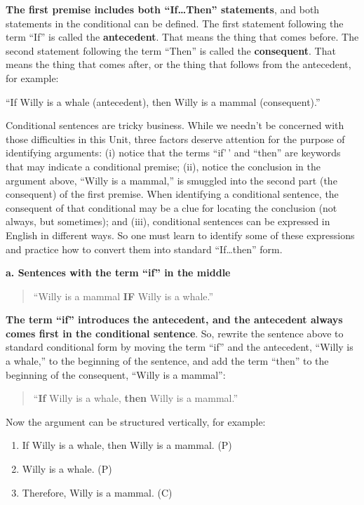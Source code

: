 \documentclass[
]{book}
\providecommand{\tightlist}{%
  \setlength{\itemsep}{0pt}\setlength{\parskip}{0pt}}
\begin{document}
\textbf{The first premise includes both ``If\ldots Then'' statements}, and both statements in the conditional can be defined. The first statement following the term ``If'' is called the \textbf{antecedent}. That means the thing that comes before. The second statement following the term ``Then'' is called the \textbf{consequent}. That means the thing that comes after, or the thing that follows from the antecedent, for example:

``If Willy is a whale (antecedent), then Willy is a mammal (consequent).''

Conditional sentences are tricky business. While we needn't be concerned with those difficulties in this Unit, three factors deserve attention for the purpose of identifying arguments: (i) notice that the terms ``if'\,' and ``then'' are keywords that may indicate a conditional premise; (ii), notice the conclusion in the argument above, ``Willy is a mammal,'' is smuggled into the second part (the consequent) of the first premise. When identifying a conditional sentence, the consequent of that conditional may be a clue for locating the conclusion (not always, but sometimes); and (iii), conditional sentences can be expressed in English in different ways. So one must learn to identify some of these expressions and practice how to convert them into standard ``If\ldots then'' form.

\textbf{a. Sentences with the term ``if'' in the middle}

\begin{quote}
``Willy is a mammal \textbf{IF} Willy is a whale.''
\end{quote}

\textbf{The term ``if'' introduces the antecedent, and the antecedent always comes first in the conditional sentence}. So, rewrite the sentence above to standard conditional form by moving the term ``if'' and the antecedent, ``Willy is a whale,'' to the beginning of the sentence, and add the term ``then'' to the beginning of the consequent, ``Willy is a mammal'':

\begin{quote}
``\textbf{If} Willy is a whale, \textbf{then} Willy is a mammal.''
\end{quote}

Now the argument can be structured vertically, for example:

\begin{enumerate}
\def\labelenumi{\arabic{enumi}.}
\tightlist
\item
  If Willy is a whale, then Willy is a mammal. (P)\\
\item
  Willy is a whale. (P)\\
\item
  Therefore, Willy is a mammal. (C)
\end{enumerate}
\end{document}
